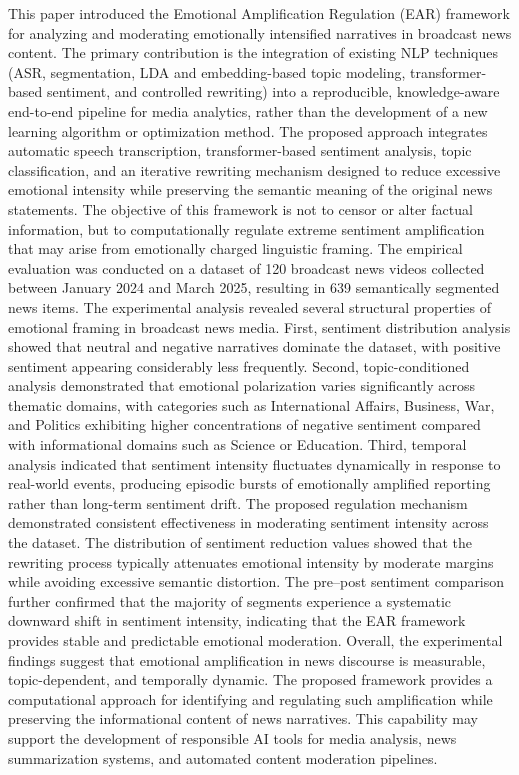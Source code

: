 \documentclass[final,1p,times]{elsarticle}
\begin{document}
This paper introduced the Emotional Amplification Regulation (EAR) framework for analyzing and moderating emotionally intensified narratives in broadcast news content. The primary contribution is the integration of existing NLP techniques (ASR, segmentation, LDA and embedding-based topic modeling, transformer-based sentiment, and controlled rewriting) into a reproducible, knowledge-aware end-to-end pipeline for media analytics, rather than the development of a new learning algorithm or optimization method. The proposed approach integrates automatic speech transcription, transformer-based sentiment analysis, topic classification, and an iterative rewriting mechanism designed to reduce excessive emotional intensity while preserving the semantic meaning of the original news statements. The objective of this framework is not to censor or alter factual information, but to computationally regulate extreme sentiment amplification that may arise from emotionally charged linguistic framing. The empirical evaluation was conducted on a dataset of 120 broadcast news videos collected between January 2024 and March 2025, resulting in 639 semantically segmented news items. The experimental analysis revealed several structural properties of emotional framing in broadcast news media. First, sentiment distribution analysis showed that neutral and negative narratives dominate the dataset, with positive sentiment appearing considerably less frequently. Second, topic-conditioned analysis demonstrated that emotional polarization varies significantly across thematic domains, with categories such as International Affairs, Business, War, and Politics exhibiting higher concentrations of negative sentiment compared with informational domains such as Science or Education. Third, temporal analysis indicated that sentiment intensity fluctuates dynamically in response to real-world events, producing episodic bursts of emotionally amplified reporting rather than long-term sentiment drift. The proposed regulation mechanism demonstrated consistent effectiveness in moderating sentiment intensity across the dataset. The distribution of sentiment reduction values showed that the rewriting process typically attenuates emotional intensity by moderate margins while avoiding excessive semantic distortion. The pre–post sentiment comparison further confirmed that the majority of segments experience a systematic downward shift in sentiment intensity, indicating that the EAR framework provides stable and predictable emotional moderation. Overall, the experimental findings suggest that emotional amplification in news discourse is measurable, topic-dependent, and temporally dynamic. The proposed framework provides a computational approach for identifying and regulating such amplification while preserving the informational content of news narratives. This capability may support the development of responsible AI tools for media analysis, news summarization systems, and automated content moderation pipelines.
\end{document}
